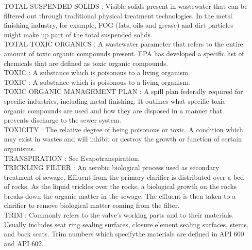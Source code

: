 \vspace{0.15cm}
TOTAL SUSPENDED SOLIDS :   Visible solids present in wastewater that can be filtered out through traditional physical treatment technologies. In the metal finishing industry, for example, FOG (fats, oils and grease) and dirt particles might make up part of the total suspended solids.\\
\vspace{0.15cm}
TOTAL TOXIC ORGANICS :   A wastewater parameter that refers to the entire amount of toxic organic compounds present.   EPA has developed a specific list of chemicals that are defined as toxic organic compounds.\\
\vspace{0.15cm}
TOXIC :  A substance which is poisonous to a living organism.\\
\vspace{0.15cm}
TOXIC :  A substance which is poisonous to a living organism.\\
\vspace{0.15cm}
TOXIC ORGANIC MANAGEMENT PLAN :   A spill plan federally required for specific industries, including metal finishing. It outlines what specific toxic organic compounds are used and how they are disposed in a manner that prevents discharge to the sewer system.\\
\vspace{0.15cm}
TOXICITY :  The relative degree of being poisonous or toxic. A condition which may exist in wastes and will inhibit or destroy the growth or function of certain organisms.\\
\vspace{0.15cm}
TRANSPIRATION :  See Evapotranspiration.\\
\vspace{0.15cm}
TRICKLING FILTER :   An aerobic biological process used as secondary treatment of sewage. Effluent from the primary clarifier is distributed over a bed of rocks. As the liquid trickles over the rocks, a biological growth on the rocks breaks down the organic matter in the sewage. The effluent is then taken to a clarifier to remove biological matter coming from the filter.\\
\vspace{0.15cm}
TRIM :   Commonly refers to the valve's working parts and to their materials. Usually includes seat ring sealing surfaces, closure element sealing surfaces, stems, and back seats. Trim numbers which specifythe materials are defined in API 600 and API 602.\\
